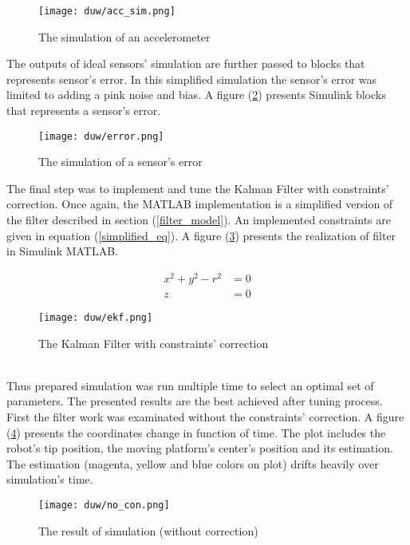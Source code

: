 \begin{figure}[!h]
	\centering
	\texttt{[image: duw/acc\_sim.png]}
	\caption{The simulation of an accelerometer}
	\label{acc_sym}
\end{figure}

The outputs of ideal sensors' simulation are further passed to blocks that represents sensor's error. In this simplified simulation the sensor's error was limited to adding a pink noise and bias. A figure (\ref{error_sensor}) presents Simulink blocks that represents a sensor's error.

\begin{figure}[!h]
	\centering
	\texttt{[image: duw/error.png]}
	\caption{The simulation of a sensor's error}
	\label{error_sensor}
\end{figure}

The final step was to implement and tune the Kalman Filter with constraints' correction. Once again, the MATLAB implementation is a simplified version of the filter described in section (\ref{filter_model}). An implemented constraints are given in equation (\ref{simplified_eq}).  A figure (\ref{ekf_sim}) presents the realization of filter in Simulink MATLAB.

\begin{align}
	x^2 + y^2 - r^2 &= 0\\
	z &= 0
	\label{simplified_eq}
\end{align}

\begin{figure}[!h]
	\centering
	\texttt{[image: duw/ekf.png]}
	\caption{The Kalman Filter with constraints' correction}
	\label{ekf_sim}
\end{figure}
\ \\

Thus prepared simulation was run multiple time to select an optimal set of parameters. The presented results are the best achieved after tuning process. First the filter work was examinated without the constraints' correction. A figure (\ref{no_con}) presents the coordinates change in function of time. The plot includes the robot's tip position, the moving platform's center's position and its estimation. The estimation (magenta, yellow and blue colors on plot) drifts heavily over simulation's time.\\

\begin{figure}[!h]
	\centering
	\texttt{[image: duw/no\_con.png]}
	\caption{The result of simulation (without correction)}
	\label{no_con}
\end{figure}

